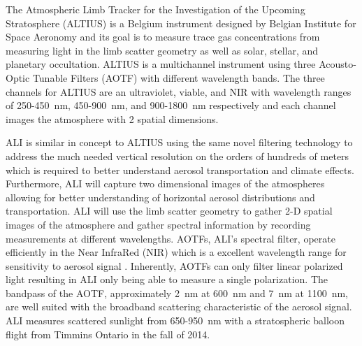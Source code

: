\documentclass[12pt]{article}
\begin{document}
The Atmospheric Limb Tracker for the Investigation of the Upcoming Stratosphere (ALTIUS) \citep{Dekemper2012} is a Belgium instrument designed by Belgian Institute for Space Aeronomy and its goal is to measure trace gas concentrations from measuring light in the limb scatter geometry as well as solar, stellar, and planetary occultation. ALTIUS is a multichannel instrument using three Acousto-Optic Tunable Filters (AOTF) with different wavelength bands. The three channels for ALTIUS are an ultraviolet, viable, and NIR with wavelength ranges of 250-450~nm, 450-900~nm, and 900-1800~nm respectively and each channel images the atmosphere with 2 spatial dimensions.

ALI is similar in concept to ALTIUS using the same novel filtering technology to address the much needed vertical resolution on the orders of hundreds of meters which is required to better understand aerosol transportation and climate effects. Furthermore, ALI will capture two dimensional images of the atmospheres allowing for better understanding of horizontal aerosol distributions and transportation. ALI will use the limb scatter geometry to gather 2-D spatial images of the atmosphere and gather spectral information by recording measurements at different wavelengths. AOTFs, ALI's spectral filter, operate efficiently in the Near InfraRed (NIR) which is a excellent wavelength range for sensitivity to aerosol signal \citep{Rieger2014}. Inherently, AOTFs can only filter linear polarized light resulting in ALI only being able to measure a single polarization. The bandpass of the AOTF, approximately 2~nm at 600~nm and 7~nm at 1100~nm, are well suited with the broadband scattering characteristic of the aerosol signal. ALI measures scattered sunlight from 650-950~nm with a stratospheric balloon flight from Timmins Ontario in the fall of 2014.
\end{document}

